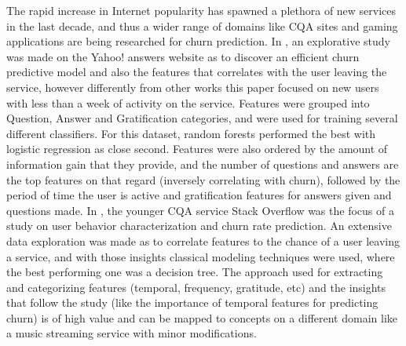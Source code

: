 \documentclass{kththesis}
\begin{document}
The rapid increase in Internet popularity has spawned a plethora of new services in the last decade, and thus a wider range of domains like CQA sites and gaming applications are being researched for churn prediction. In \citep{Dror2012}, an explorative study was made on the Yahoo! answers website as to discover an efficient churn predictive model and also the features that correlates with the user leaving the service, however differently from other works this paper focused on new users with less than a week of activity on the service. Features were grouped into Question, Answer and Gratification categories, and were used for training several different classifiers. For this dataset, random forests performed the best with logistic regression as close second. Features were also ordered by the amount of information gain that they provide, and the number of questions and answers are the top features on that regard (inversely correlating with churn), followed by the period of time the user is active and gratification features for answers given and questions made. In \citep{Pudipeddi2014}, the younger CQA service Stack Overflow was the focus of a study on user behavior characterization and churn rate prediction. An extensive data exploration was made as to correlate features to the chance of a user leaving a service, and with those insights classical modeling techniques were used, where the best performing one was a decision tree. The approach used for extracting and categorizing features (temporal, frequency, gratitude, etc) and the insights that follow the study (like the importance of temporal features for predicting churn) is of high value and can be mapped to concepts on a different domain like a music streaming service with minor modifications. 
\end{document}
